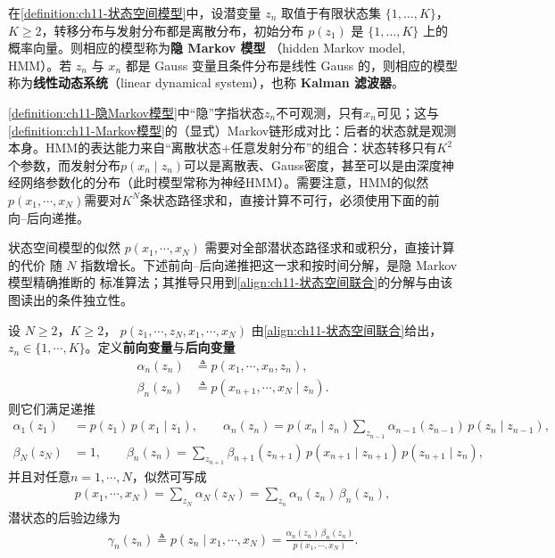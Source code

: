 \documentclass[../../main.tex]{subfiles}
\begin{document}
\begin{definition}[隐 Markov 模型]\label{definition:ch11-隐Markov模型}
在\cref{definition:ch11-状态空间模型}中，设潜变量 $z_n$ 取值于有限状态集
$\{1,\dots,K\}$，$K\geqslant2$，转移分布与发射分布都是离散分布，初始分布
$p(z_1)$ 是 $\{1,\dots,K\}$ 上的概率向量。则相应的模型称为\textbf{隐 Markov 模型}
（hidden Markov model, HMM）。若 $z_n$ 与 $x_n$ 都是 Gauss 变量且条件分布是线性
Gauss 的，则相应的模型称为\textbf{线性动态系统}（linear dynamical system），也称
\textbf{Kalman 滤波器}。
\end{definition}

\begin{remark}
\cref{definition:ch11-隐Markov模型}中“隐”字指状态$z_n$不可观测，只有$x_n$可见；这与\cref{definition:ch11-Markov模型}的（显式）Markov链形成对比：后者的状态就是观测本身。HMM的表达能力来自“离散状态+任意发射分布”的组合：状态转移只有$K^2$个参数，而发射分布$p(x_n\mid z_n)$可以是离散表、Gauss密度，甚至可以是由深度神经网络参数化的分布（此时模型常称为神经HMM）。需要注意，HMM的似然$p(x_1,\cdots,x_N)$需要对$K^N$条状态路径求和，直接计算不可行，必须使用下面的前向–后向递推。
\end{remark}

\begin{remark}
状态空间模型的似然 $p(x_1,\cdots,x_N)$ 需要对全部潜状态路径求和或积分，直接计算的代价
随 $N$ 指数增长。下述前向--后向递推把这一求和按时间分解，是隐 Markov 模型精确推断的
标准算法；其推导只用到\eqref{align:ch11-状态空间联合}的分解与由该图读出的条件独立性。
\end{remark}

\begin{proposition}\label{proposition:ch11-前向后向}
设 $N\geqslant2$，$K\geqslant2$，
$p(z_1,\cdots,z_N,x_1,\cdots,x_N)$ 由\eqref{align:ch11-状态空间联合}给出，
$z_n\in\{1,\cdots,K\}$。定义\textbf{前向变量}与\textbf{后向变量}
\begin{align}
  \alpha_n(z_n) &\triangleq p(x_1,\cdots,x_n,z_n),\\
  \beta_n(z_n) &\triangleq p(x_{n+1},\cdots,x_N\mid z_n).
\end{align}
则它们满足递推
\begin{align}
  \alpha_1(z_1) &= p(z_1)\,p(x_1\mid z_1),\qquad
  \alpha_n(z_n) = p(x_n\mid z_n)\sum_{z_{n-1}}\alpha_{n-1}(z_{n-1})\,p(z_n\mid z_{n-1}),
  \label{align:ch11-前向递推}\\
  \beta_N(z_N) &= 1,\qquad
  \beta_n(z_n) = \sum_{z_{n+1}}\beta_{n+1}(z_{n+1})\,p(x_{n+1}\mid z_{n+1})\,p(z_{n+1}\mid z_n),
  \label{align:ch11-后向递推}
\end{align}
并且对任意$n=1,\cdots,N$，似然可写成
\begin{align}
  p(x_1,\cdots,x_N) = \sum_{z_N}\alpha_N(z_N) = \sum_{z_n}\alpha_n(z_n)\,\beta_n(z_n),
  \label{align:ch11-似然前向后向}
\end{align}
潜状态的后验边缘为
\begin{align}
  \gamma_n(z_n) \triangleq p(z_n\mid x_1,\cdots,x_N) = \frac{\alpha_n(z_n)\,\beta_n(z_n)}{p(x_1,\cdots,x_N)}.
  \label{align:ch11-后验边缘}
\end{align}
\end{proposition}
\end{document}
